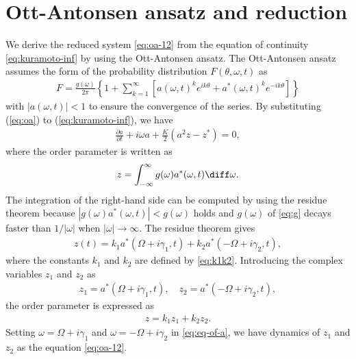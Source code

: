 
\section{Ott-Antonsen ansatz and reduction}
\label{sec:oa}
  We derive the reduced system \eqref{eq:oa-12} from the equation of continuity \eqref{eq:kuramoto-inf} by using the Ott-Antonsen ansatz.
The Ott-Antonsen ansatz assumes the form of the probability distribution
$F(\theta,\omega,t)$ as
\begin{align}
  F = \frac{g(\omega)}{2\pi}
  \left\{ 1 + \sum_{k=1}^{\infty} \left[ a(\omega,t)^{k} e^{ik\theta}
      + a^{\ast}(\omega,t)^{k} e^{-ik\theta} \right] \right\}
  \label{eq:oa}
\end{align}
with $\left|a(\omega,t)\right|<1$ to ensure the convergence of the series.
By substituting (\ref{eq:oa}) to (\ref{eq:kuramoto-inf}), we have
\begin{align}
  \label{eq:eq-of-a}
  \frac{\partial a}{\partial t}+i\omega a+\frac{K}{2}\left(a^{2}z-z^{*}\right)=0,
\end{align}
where the order parameter is written as
\begin{align}
  z = \int_{-\infty}^{\infty}g(\omega)a^{\ast}(\omega,t) \diff\omega.
  \label{eq:oa-z}
\end{align}
The integration of the right-hand side can be computed
by using the residue theorem 
because $|g(\omega)a^{\ast}(\omega,t)|<g(\omega)$ holds
and $g(\omega)$ of \eqref{eq:g} decays faster than $1/|\omega|$
when $|\omega|\to\infty$.
The residue theorem gives
\begin{align}
  z(t)
  = k_{1} a^{\ast}(\Omega+i\gamma_{1},t)
  + k_{2} a^{\ast}(-\Omega+i\gamma_{2},t),
\end{align}
where the constants $k_{1}$ and $k_{2}$ are defined by \eqref{eq:k1k2}.
Introducing the complex variables $z_{1}$ and $z_{2}$ as
\begin{align}
  z_{1} = a^{\ast}(\Omega+i\gamma_{1},t),
  \quad
  z_{2} = a^{\ast}(-\Omega+i\gamma_{2},t),
\end{align}
the order parameter is expressed as
\begin{align}
  z = k_{1}z_{1}+k_{2}z_{2}.
\end{align}
Setting $\omega=\Omega+i\gamma_{1}$ and $\omega=-\Omega+i\gamma_{2}$
in \eqref{eq:eq-of-a}, we have dynamics of $z_{1}$ and $z_{2}$
as the equation \eqref{eq:oa-12}.



